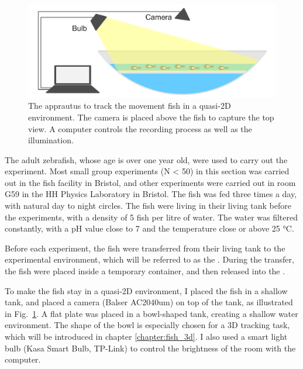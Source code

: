 \documentclass[11pt,twoside]{report}
\begin{document}
\begin{figure}
  \includegraphics[width=\linewidth,outer]{apprautus-2d}
  \caption[Two dimensional fish tracking apprautus]{\label{fig:fish_apprautus_2d}
  The apprautus to track the movement fish in a quasi-2D environment. The camera is placed above the fish to capture the top view. A computer controls the recording process as well as the illumination.
  }
\end{figure}

The adult zebrafish, whose age is over one year old, were used to carry out the experiment. Most small group experiments (N < 50) in this section was carried out in the fish facility in Bristol, and other experiments were carried out in room G59 in the HH Physics Laboratory in Bristol. The fish was fed three times a day, with natural day to night circles. The fish were living in their living tank before the experiments, with a density of 5 fish per litre of water. The water was filtered constantly, with a pH value close to 7 and the temperature close or above 25 °C.

Before each experiment, the fish were transferred from their living tank to the experimental environment, which will be referred to as the {\ot}. During the transfer, the fish were placed inside a temporary container, and then released into the {\ot}.

To make the fish stay in a quasi-2D environment, I placed the fish in a shallow tank, and placed a camera (Balser AC2040um) on top of the tank, as illustrated in Fig.~\ref{fig:fish_apprautus_2d}. A flat plate was placed in a bowl-shaped tank, creating a shallow water environment. The shape of the bowl is especially chosen for a 3D tracking task, which will be introduced in chapter \ref{chapter:fish_3d}.
I also used a smart light bulb (Kasa Smart Bulb, TP-Link) to control the brightness of the room with the computer.
\end{document}
